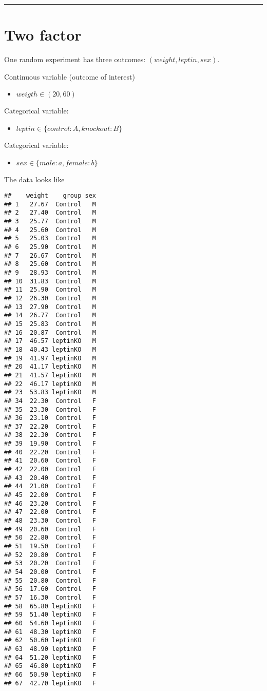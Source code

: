 \documentclass[
]{book}
\providecommand{\tightlist}{%
  \setlength{\itemsep}{0pt}\setlength{\parskip}{0pt}}
\begin{document}
\begin{center}\rule{0.5\linewidth}{0.5pt}\end{center}

\hypertarget{two-factor}{%
\section{Two factor}\label{two-factor}}

One random experiment has three outcomes: \((weight, leptin, sex)\).

Continuous variable (outcome of interest)

\begin{itemize}
\tightlist
\item
  \(weigth \in (20, 60)\)
\end{itemize}

Categorical variable:

\begin{itemize}
\tightlist
\item
  \(leptin \in \{control:A,knockout:B\}\)
\end{itemize}

Categorical variable:

\begin{itemize}
\tightlist
\item
  \(sex \in \{male:a,female:b\}\)
\end{itemize}

The data looks like

\begin{verbatim}
##    weight    group sex
## 1   27.67  Control   M
## 2   27.40  Control   M
## 3   25.77  Control   M
## 4   25.60  Control   M
## 5   25.03  Control   M
## 6   25.90  Control   M
## 7   26.67  Control   M
## 8   25.60  Control   M
## 9   28.93  Control   M
## 10  31.83  Control   M
## 11  25.90  Control   M
## 12  26.30  Control   M
## 13  27.90  Control   M
## 14  26.77  Control   M
## 15  25.83  Control   M
## 16  20.87  Control   M
## 17  46.57 leptinKO   M
## 18  40.43 leptinKO   M
## 19  41.97 leptinKO   M
## 20  41.17 leptinKO   M
## 21  41.57 leptinKO   M
## 22  46.17 leptinKO   M
## 23  53.83 leptinKO   M
## 34  22.30  Control   F
## 35  23.30  Control   F
## 36  23.10  Control   F
## 37  22.20  Control   F
## 38  22.30  Control   F
## 39  19.90  Control   F
## 40  22.20  Control   F
## 41  20.60  Control   F
## 42  22.00  Control   F
## 43  20.40  Control   F
## 44  21.00  Control   F
## 45  22.00  Control   F
## 46  23.20  Control   F
## 47  22.00  Control   F
## 48  23.30  Control   F
## 49  20.60  Control   F
## 50  22.80  Control   F
## 51  19.50  Control   F
## 52  20.80  Control   F
## 53  20.20  Control   F
## 54  20.00  Control   F
## 55  20.80  Control   F
## 56  17.60  Control   F
## 57  16.30  Control   F
## 58  65.80 leptinKO   F
## 59  51.40 leptinKO   F
## 60  54.60 leptinKO   F
## 61  48.30 leptinKO   F
## 62  50.60 leptinKO   F
## 63  48.90 leptinKO   F
## 64  51.20 leptinKO   F
## 65  46.80 leptinKO   F
## 66  50.90 leptinKO   F
## 67  42.70 leptinKO   F
\end{verbatim}
\end{document}
